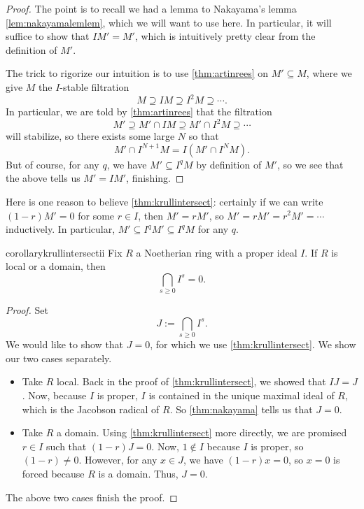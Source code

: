 \begin{proof}
	The point is to recall we had a lemma to Nakayama's lemma \autoref{lem:nakayamalemlem}, which we will want to use here. In particular, it will suffice to show that $IM'=M'$, which is intuitively pretty clear from the definition of $M'$.

	The trick to rigorize our intuition is to use \autoref{thm:artinrees} on $M'\subseteq M$, where we give $M$ the $I$-stable filtration
	\[M\supseteq IM\supseteq I^2M\supseteq\cdots.\]
	In particular, we are told by \autoref{thm:artinrees} that the filtration
	\[M'\supseteq M'\cap IM\supseteq M'\cap I^2M\supseteq\cdots\]
	will stabilize, so there exists some large $N$ so that
	\[M'\cap I^{N+1}M=I\left(M'\cap I^NM\right).\]
	But of course, for any $q$, we have $M'\subseteq I^qM$ by definition of $M'$, so we see that the above tells us $M'=IM'$, finishing.
\end{proof}
\begin{remark}[Nir]
	Here is one reason to believe \autoref{thm:krullintersect}: certainly if we can write $(1-r)M'=0$ for some $r\in I$, then $M'=rM'$, so $M'=rM'=r^2M'=\cdots$ inductively. In particular, $M'\subseteq I^qM'\subseteq I^qM$ for any $q$.
\end{remark}
\begin{restatable}{corollary}{krullintersectii} \label{cor:krullintersect}
	Fix $R$ a Noetherian ring with a proper ideal $I$. If $R$ is local or a domain, then
	\[\bigcap_{s\ge0}I^s=0.\]
\end{restatable}
\begin{proof}
	Set
	\[J:=\bigcap_{s\ge0}I^s.\]
	We would like to show that $J=0$, for which we use \autoref{thm:krullintersect}. We show our two cases separately.
	\begin{itemize}
		\item Take $R$ local. Back in the proof of \autoref{thm:krullintersect}, we showed that $IJ=J$. Now, because $I$ is proper, $I$ is contained in the unique maximal ideal of $R$, which is the Jacobson radical of $R$. So \autoref{thm:nakayama} tells us that $J=0$.
		\item Take $R$ a domain. Using \autoref{thm:krullintersect} more directly, we are promised $r\in I$ such that $(1-r)J=0$. Now, $1\notin I$ because $I$ is proper, so $(1-r)\ne0$. However, for any $x\in J$, we have $(1-r)x=0$, so $x=0$ is forced because $R$ is a domain. Thus, $J=0$.
	\end{itemize}
	The above two cases finish the proof.
\end{proof}
